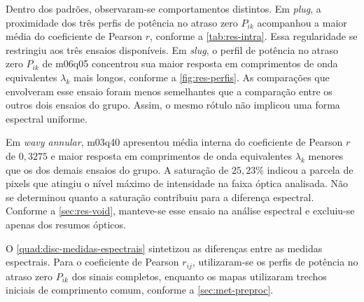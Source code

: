 Dentro dos padrões, observaram-se comportamentos distintos. Em \textit{plug},
a proximidade dos três perfis de potência no atraso zero $P_{ik}$ acompanhou
a maior média do coeficiente de Pearson $r$, conforme a \autoref{tab:res-intra}.
Essa regularidade se restringiu aos três ensaios disponíveis. Em \textit{slug},
o perfil de potência no atraso zero $P_{ik}$ de m06q05 concentrou sua maior
resposta em comprimentos de onda equivalentes $\lambda_k$ mais longos,
conforme a \autoref{fig:res-perfis}. As comparações que envolveram
esse ensaio foram menos semelhantes que a comparação entre os outros dois
ensaios do grupo. Assim, o mesmo rótulo não implicou uma forma espectral uniforme.

Em \textit{wavy annular}, m03q40 apresentou média interna do coeficiente de
Pearson $r$ de $0{,}3275$ e maior resposta em comprimentos de onda equivalentes
$\lambda_k$ menores que os dos demais ensaios do grupo. A saturação de
$25{,}23\%$ indicou a parcela de pixels que atingiu o nível máximo de
intensidade na faixa óptica analisada. Não se determinou quanto a saturação
contribuiu para a diferença espectral. Conforme a \autoref{sec:res-void},
manteve-se esse ensaio na análise espectral e excluiu-se apenas dos resumos ópticos.

O \autoref{quad:disc-medidas-espectrais} sintetizou as diferenças entre
as medidas espectrais. Para o coeficiente de Pearson $r_{ij}$, utilizaram-se
os perfis de potência no atraso zero $P_{ik}$ dos sinais completos,
enquanto os mapas utilizaram trechos iniciais de comprimento comum,
conforme a \autoref{sec:met-preproc}.

